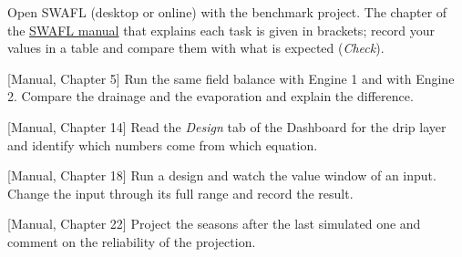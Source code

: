 {\small Open SWAFL (desktop or online) with the benchmark project. The chapter of the \href{https://github.com/halilunaziru73-creator/Coupled-Water-Fluxes-Pore-Scale-Dynamics-Precision-Irrigation-Mulching-Feedback-Loops/raw/main/Software/v1.1.0/SWAFL_Desktop/docs/manual_v1.1.0/SWAFL_Manual_v1.1.0.pdf}{SWAFL manual} that explains each task is given in brackets; record your values in a table and compare them with what is expected (\emph{Check}).}\par\vspace{3pt}
\begin{exlist}
\item {\color{khblue}[Manual, Chapter 5]} Run the same field balance with Engine 1 and with Engine 2. Compare the drainage and the evaporation and explain the difference.\par{}
\item {\color{khblue}[Manual, Chapter 14]} Read the \emph{Design} tab of the Dashboard for the drip layer and identify which numbers come from which equation.\par{}
\item {\color{khblue}[Manual, Chapter 18]} Run a design and watch the value window of an input. Change the input through its full range and record the result.\par{}
\item {\color{khblue}[Manual, Chapter 22]} Project the seasons after the last simulated one and comment on the reliability of the projection.\par{}
\end{exlist}
